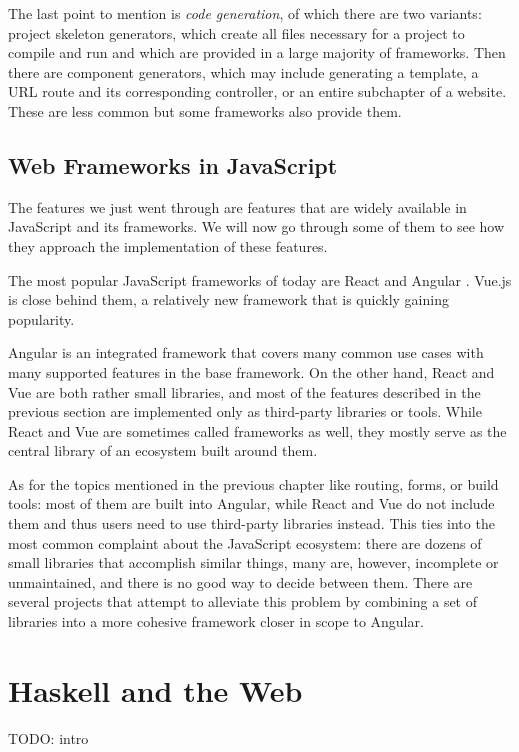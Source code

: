 \documentclass[english,odsaz]{fitthesis}
\begin{document}
The last point to mention is \emph{code generation}, of which there are two variants:
project skeleton generators, which create all files necessary for a project to
compile and run and which are provided in a large majority of frameworks. Then
there are component generators, which may include generating a template, a URL
route and its corresponding controller, or an entire subchapter of a
website. These are less common but some frameworks also provide them.

\section{Web Frameworks in JavaScript}
\label{sec:org649d4f6}
The features we just went through are features that are widely available in
JavaScript and its frameworks. We will now go through some of them to see how
they approach the implementation of these features.

The most popular JavaScript frameworks of today are React and Angular
\cite{frontend-cmp}. Vue.js is close behind them, a relatively new framework that
is quickly gaining popularity.

Angular is an integrated framework that covers many common use cases with many
supported features in the base framework. On the other hand, React and Vue are
both rather small libraries, and most of the features described in the previous
section are implemented only as third-party libraries or tools. While React and
Vue are sometimes called frameworks as well, they mostly serve as the central
library of an ecosystem built around them.

As for the topics mentioned in the previous chapter like routing, forms, or
build tools: most of them are built into Angular, while React and Vue do not
include them and thus users need to use third-party libraries instead. This ties
into the most common complaint about the JavaScript ecosystem: there are dozens
of small libraries that accomplish similar things, many are, however, incomplete
or unmaintained, and there is no good way to decide between them. There are
several projects that attempt to alleviate this problem by combining a set of
libraries into a more cohesive framework closer in scope to Angular.

\chapter{Haskell and the Web}
\label{sec:org86f916d}
TODO: intro
\end{document}

